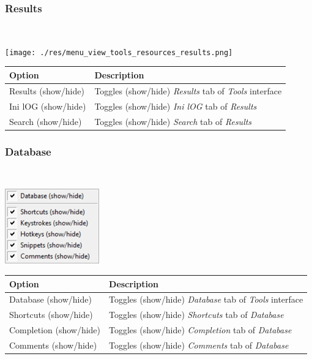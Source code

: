 \hypertarget{menu_view_tools_resources_results}{}
\subsubsection{Results}\\

\texttt{[image: ./res/menu\_view\_tools\_resources\_results.png]}\\

\begin{scriptsize}\begin{tabularx}{\textwidth}{>{\hsize=0.3\hsize}X>{\hsize=0.7\hsize}X}\\
    \hline
    \textbf{Option} & \textbf{Description} \\
    \hline
    Results (show/hide) & Toggles (show/hide) \textit{Results} tab of \textit{Tools} interface \\
    Ini lOG (show/hide) & Toggles (show/hide) \textit{Ini lOG} tab of \textit{Results} \\
    Search (show/hide) & Toggles (show/hide) \textit{Search} tab of \textit{Results} \\
    \hline
  \end{tabularx}\end{scriptsize}


\hypertarget{menu_view_tools_resources_database}{}
\subsubsection{Database}\\

\includegraphics[scale=0.50]{./res/menu_view_tools_resources_database.png}\\

\begin{scriptsize}\begin{tabularx}{\textwidth}{>{\hsize=0.3\hsize}X>{\hsize=0.7\hsize}X}\\
    \hline
    \textbf{Option} & \textbf{Description} \\
    \hline
    Database (show/hide) & Toggles (show/hide) \textit{Database} tab of \textit{Tools} interface \\
    Shortcuts (show/hide) & Toggles (show/hide) \textit{Shortcuts} tab of \textit{Database} \\
    Completion (show/hide) & Toggles (show/hide) \textit{Completion} tab of \textit{Database} \\
    Comments (show/hide) & Toggles (show/hide) \textit{Comments} tab of \textit{Database} \\
    \hline
  \end{tabularx}\end{scriptsize}


